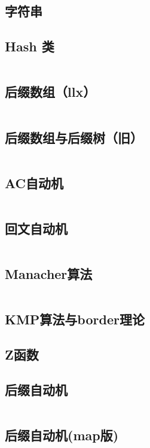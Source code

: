 \documentclass[10pt, a4paper, oneside]{ctexart}
\begin{document}
\begin{multicols}{2}
        
        \section{字符串}
        \subsection{Hash 类}
        \inputminted{cpp}{src/string/hash.cpp}
        \subsection{后缀数组（llx）}
        \inputminted{cpp}{src/string/llx_SA.cpp}
        \subsection{后缀数组与后缀树（旧）}
        \inputminted{cpp}{src/string/SA.cpp}
        \subsection{AC自动机}
        \inputminted{cpp}{src/string/ACAM.cpp}
        \subsection{回文自动机}
        \inputminted{cpp}{src/string/PAM.cpp}
        \subsection{Manacher算法}
        \inputminted{cpp}{src/string/manacher.cpp}
        \subsection{KMP算法与border理论}
        
        \subsection{Z函数}
        
        \subsection{后缀自动机}
        \inputminted{cpp}{src/string/SAM.cpp}
        \subsection{后缀自动机(map版)}
        \inputminted[highlightlines={3,10,15,18}]{cpp}{src/string/SAM_map.cpp}

\end{multicols}
\end{document}
